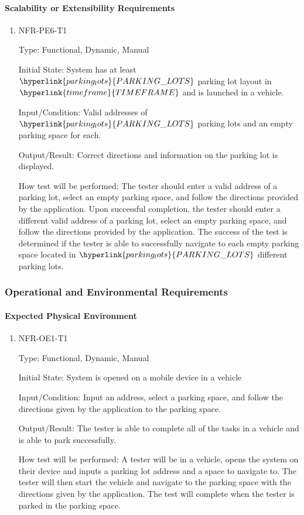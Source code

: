 \documentclass[12pt, titlepage]{article}
\begin{document}
\paragraph{Scalability or Extensibility Requirements}

\begin{enumerate}

\item{NFR-PE6-T1}

Type: Functional, Dynamic, Manual
					
Initial State: System has at least $\hyperlink{parking_lots}{PARKING\_LOTS}$
parking lot layout in \\$\hyperlink{timeframe}{TIMEFRAME}$ and is launched in a
vehicle.
					
Input/Condition: Valid addresses of $\hyperlink{parking_lots}{PARKING\_LOTS}$
parking lots and an empty parking space for each.
					
Output/Result: Correct directions and information on the parking lot is
displayed.
					
How test will be performed: The tester should enter a valid address of a parking
lot, select an empty parking space, and follow the directions provided by the
application. Upon successful completion, the tester should enter a different
valid address of a parking lot, select an empty parking space, and follow the
directions provided by the application. The success of the test is determined if
the tester is able to successfully navigate to each empty parking space located
in $\hyperlink{parking_lots}{PARKING\_LOTS}$ different parking lots.
					
\end{enumerate}

\subsubsection{Operational and Environmental Requirements}
\label{sec:5.2.4}
\paragraph{Expected Physical Environment}

\begin{enumerate}
\item{NFR-OE1-T1}

Type: Functional, Dynamic, Manual
					
Initial State: System is opened on a mobile device in a vehicle
					
Input/Condition: Input an address, select a parking space, and follow the
directions given by the application to the parking space.
			
Output/Result: The tester is able to complete all of the tasks in a vehicle and
is able to park successfully.
					
How test will be performed: A tester will be in a vehicle, opens the system on
their device and inputs a parking lot address and a space to navigate to. The
tester will then start the vehicle and navigate to the parking space with the
directions given by the application. The test will complete when the tester is
parked in the parking space.
\end{enumerate}
\end{document}
